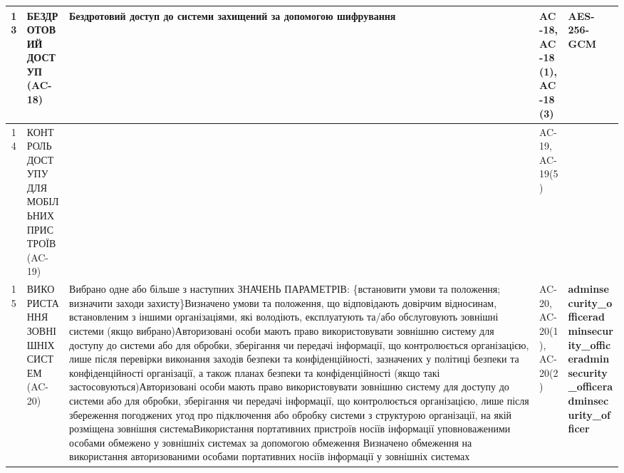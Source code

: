 \documentclass[10pt]{article}
\begin{document}
\begin{longtable}{|c|>{\raggedright\arraybackslash}p{2.5cm}|>{\raggedright\arraybackslash}p{4cm}|>{\raggedright\arraybackslash}p{3.5cm}|>{\raggedright\arraybackslash}p{5.5cm}|}
13 & БЕЗДРОТОВИЙ ДОСТУП (AC-18) & Бездротовий доступ до системи захищений за допомогою шифрування & AC-18, AC-18(1), AC-18(3) & \textbf{AES-256-GCM} \\ \hline
14 & КОНТРОЛЬ ДОСТУПУ ДЛЯ МОБІЛЬНИХ ПРИСТРОЇВ (AC-19) &  & AC-19, AC-19(5) &  \\ \hline
15 & ВИКОРИСТАННЯ ЗОВНІШНІХ СИСТЕМ (AC-20) & Вибрано одне або більше з наступних ЗНАЧЕНЬ ПАРАМЕТРІВ: \{встановити умови та положення; визначити заходи захисту\}\newline Визначено умови та положення, що відповідають довірчим відносинам, встановленим з іншими організаціями, які володіють, експлуатують та/або обслуговують зовнішні системи (якщо вибрано)\newline Авторизовані особи мають право використовувати зовнішню систему для доступу до системи або для обробки, зберігання чи передачі інформації, що контролюється організацією, лише після перевірки виконання заходів безпеки та конфіденційності, зазначених у політиці безпеки та конфіденційності організації, а також планах безпеки та конфіденційності (якщо такі застосовуються)\newline Авторизовані особи мають право використовувати зовнішню систему для доступу до системи або для обробки, зберігання чи передачі інформації, що контролюється організацією, лише після збереження погоджених угод про підключення або обробку системи з структурою організації, на якій розміщена зовнішня система\newline Використання портативних пристроїв носіїв інформації уповноваженими особами обмежено у зовнішніх системах за допомогою обмеження \newline Визначено обмеження на використання авторизованими особами портативних носіїв інформації у зовнішніх системах & AC-20, AC-20(1), AC-20(2) & \textbf{}\newline \textbf{}\newline \textbf{adminsecurity\_\allowbreak{}officer}\newline \textbf{adminsecurity\_\allowbreak{}officer}\newline \textbf{adminsecurity\_\allowbreak{}officer}\newline \textbf{adminsecurity\_\allowbreak{}officer} \\ \hline

\end{longtable}
\end{document}
